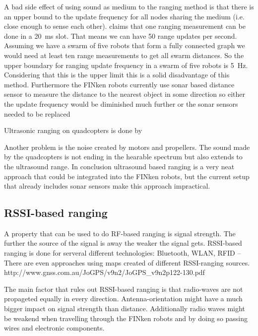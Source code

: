 A bad side effect of using sound as medium to the ranging method is that there is an upper bound to the update frequency for all nodes sharing the medium (i.e. close enough to sense each other). \cite{active_bat} claims that one ranging measurement can be done in a \SI{20}{\milli\second} slot.
That means we can have 50 range updates per second. Assuming we have a swarm of five robots that form a fully connected graph we would need at least ten range measurements to get all swarm distances.
So the upper boundary for ranging update frequency in a swarm of five robots is \SI{5}{\hertz}.
Considering that this is the upper limit this is a solid disadvantage of this method.
Furthermore the FINken robots currently use sonar based distance sensor to measure the distance to the nearest object in some direction so either the update frequency would be diminished much further or the sonar sensors needed to be replaced

Ultrasonic ranging on quadcopters is done by \cite{ultrasonic_erlangen}

Another problem is the noise created by motors and propellers.
The sound made by the quadcopters is not ending in the hearable spectrum but also extends to the ultrasound range.
In conclusion ultrasound based ranging is a very neat approach that could be integrated into the FINken robots, but the current setup that already includes sonar sensors make this approach impractical.

\subsection{RSSI-based ranging}

A property that can be used to do RF-based ranging is signal strength.
The further the source of the signal is away the weaker the signal gets.
RSSI-based ranging is done for serveral different technologies: Bluetooth, WLAN, RFID –
There are even approaches using maps created of different RSSI-ranging sources. http://www.gnss.com.au/JoGPS/v9n2/JoGPS\_v9n2p122-130.pdf 

The main factor that rules out RSSI-based ranging is that radio-waves are not propageted equally in every direction. 
Antenna-orientation might have a much bigger impact on signal strength than distance.
Additionally radio waves might be weakend when travelling through the FINken robots and by doing so passing wires and electronic components.

